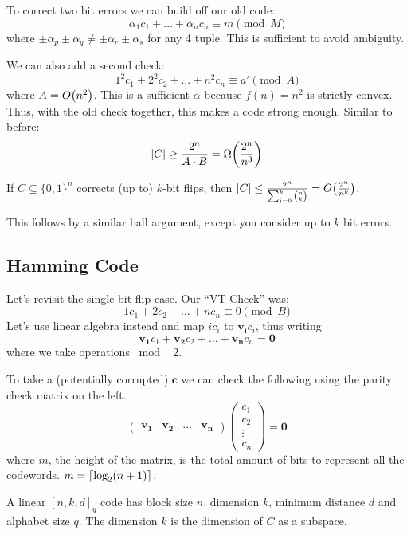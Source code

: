 To correct two bit errors we can build off our old code:
\[ \alpha_1 c_1 + \dots + \alpha_n c_n \equiv m \pmod M \]
where $\pm \alpha_p \pm \alpha_q \neq \pm \alpha_r \pm \alpha_s$ for any 4 tuple. This is sufficient to avoid ambiguity.

We can also add a second check:
\[ 1^2 c_1 + 2^2 c_2 + \dots + n^2 c_n \equiv a' \pmod A \]
where $A = O\qty(n^2)$. This is a sufficient $\alpha$ because $f(n) = n^2$ is strictly convex. Thus, with the old check together, this makes a code strong enough.
Similar to before:
\[ |C| \geq \frac{2^n}{A \cdot B} = \Omega\qty(\frac{2^n}{n^3}) \]

\begin{theorem}
    If $C \subseteq \{0, 1\}^n$ corrects (up to) $k$-bit flips, then $|C| \leq \frac{2^n}{\sum_{i = 0}^{k} \binom{n}{k}} = O\qty(\frac{2^n}{n^k})$.
\end{theorem}

This follows by a similar ball argument, except you consider up to $k$ bit errors.

\subsection{Hamming Code}
Let's revisit the single-bit flip case. Our ``VT Check'' was:
\[ 1c_1 + 2c_2 + \dots + n c_n \equiv 0 \pmod B \]
Let's use linear algebra instead and map $ic_i$ to $\mathbf{v_i} c_i$,
thus writing
\[ \mathbf{v_1} c_1 + \mathbf{v_2} c_2 + \dots + \mathbf{v_n} c_n = \mathbf{0} \]
where we take operations $\bmod \text{ } 2$. 

To take a (potentially corrupted) $\mathbf{c}$ we can check the following using the parity check matrix on the left.
\[ \begin{pmatrix}
    \mathbf{v_1} & \mathbf{v_2} & \dots & \mathbf{v_n}
\end{pmatrix} \begin{pmatrix}
    c_1 \\ c_2 \\ \vdots \\ c_n
\end{pmatrix} = \mathbf{0} \]
where $m$, the height of the matrix, is the total amount of bits to represent all the codewords. $m = \left\lceil \log_2 (n + 1) \right\rceil$.

\begin{definition} 
    A linear $[n, k, d]_q$ code has block size $n$, dimension $k$, minimum distance $d$ and alphabet size $q$. The dimension $k$ is the dimension of $C$ as a subspace.
\end{definition}

